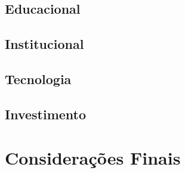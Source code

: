 
\subsection{Educacional}
\label{subsection:Educação}

\subsection{Institucional}
\label{subsection:Institucional}

\subsection{Tecnologia}
\label{subsection:Tecnologia}

\subsection{Investimento}
\label{subsection:Investimento}



\section{Considerações Finais}
\label{subsection:consideracoes_finais}